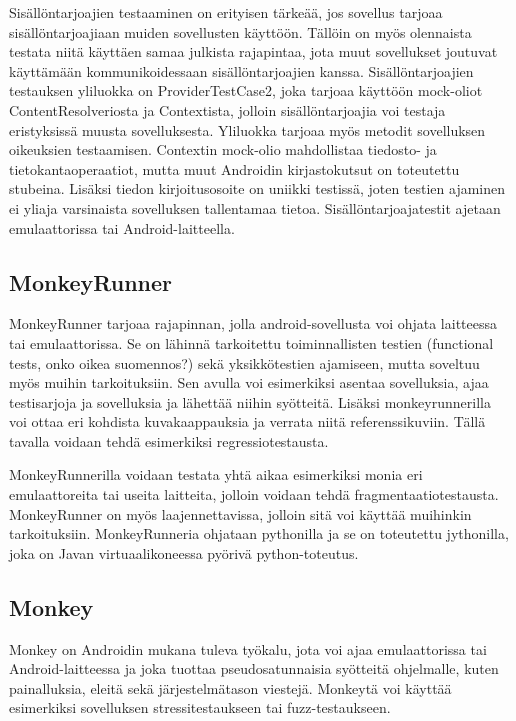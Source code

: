 Sisällöntarjoajien testaaminen on erityisen tärkeää, jos sovellus tarjoaa sisällöntarjoajiaan muiden sovellusten käyttöön. Tällöin on myös olennaista testata niitä käyttäen samaa julkista rajapintaa, jota muut sovellukset joutuvat käyttämään kommunikoidessaan sisällöntarjoajien kanssa. Sisällöntarjoajien testauksen yliluokka on ProviderTestCase2, joka tarjoaa käyttöön mock-oliot ContentResolveriosta ja Contextista, jolloin sisällöntarjoajia voi testaja eristyksissä muusta sovelluksesta. Yliluokka tarjoaa myös metodit sovelluksen oikeuksien testaamisen. Contextin mock-olio mahdollistaa tiedosto- ja tietokantaoperaatiot, mutta muut Androidin kirjastokutsut on toteutettu stubeina. Lisäksi tiedon kirjoitusosoite on uniikki testissä, joten testien ajaminen ei yliaja varsinaista sovelluksen tallentamaa tietoa. Sisällöntarjoajatestit ajetaan emulaattorissa tai Android-laitteella. \cite{android}

\subsection{MonkeyRunner}
\label{monkeyrunner}

MonkeyRunner tarjoaa rajapinnan, jolla android-sovellusta voi ohjata laitteessa tai emulaattorissa. Se on lähinnä tarkoitettu toiminnallisten testien (functional tests, onko oikea suomennos?) sekä yksikkötestien ajamiseen, mutta soveltuu myös muihin tarkoituksiin. Sen avulla voi esimerkiksi asentaa sovelluksia, ajaa testisarjoja ja sovelluksia ja lähettää niihin syötteitä. Lisäksi monkeyrunnerilla voi ottaa eri kohdista kuvakaappauksia ja verrata niitä referenssikuviin. Tällä tavalla voidaan tehdä esimerkiksi regressiotestausta.

MonkeyRunnerilla voidaan testata yhtä aikaa esimerkiksi monia eri emulaattoreita tai useita laitteita, jolloin voidaan tehdä fragmentaatiotestausta. MonkeyRunner on myös laajennettavissa, jolloin sitä voi käyttää muihinkin tarkoituksiin. MonkeyRunneria ohjataan pythonilla ja se on toteutettu jythonilla, joka on Javan virtuaalikoneessa pyörivä python-toteutus.\cite{android}

\subsection{Monkey}

Monkey on Androidin mukana tuleva työkalu, jota voi ajaa emulaattorissa tai Android-laitteessa ja joka tuottaa pseudosatunnaisia syötteitä ohjelmalle, kuten painalluksia, eleitä sekä järjestelmätason viestejä. Monkeytä voi käyttää esimerkiksi sovelluksen stressitestaukseen tai fuzz-testaukseen.

